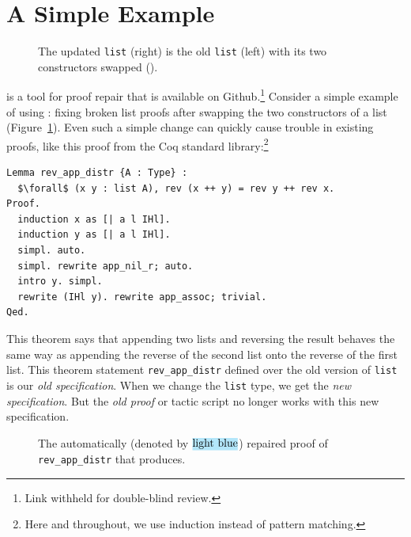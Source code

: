\section{A Simple Example}
\label{sec:overview}

\begin{figure}
\begin{minipage}{0.46\textwidth}
   
\end{minipage}
\hfill
\begin{minipage}{0.46\textwidth}
   
\end{minipage}
\caption{The updated \lstinline{list} (right) is the old \lstinline{list} (left) with its two constructors swapped ().}
\label{fig:listswap}
\end{figure}

\toolname is a tool for proof repair that is available on Github.\footnote{Link withheld for double-blind review.}
Consider a simple example of using \toolname: fixing broken list proofs after swapping the two constructors of a list (Figure~\ref{fig:listswap}).
Even such a simple change can quickly cause trouble in existing proofs, like this proof from the Coq standard library:\footnote{Here and throughout, we use induction instead of pattern matching.}

\begin{lstlisting}
Lemma rev_app_distr {A : Type} :
  $\forall$ (x y : list A), rev (x ++ y) = rev y ++ rev x.
Proof.
  induction x as [| a l IHl].
  induction y as [| a l IHl].
  simpl. auto.
  simpl. rewrite app_nil_r; auto.
  intro y. simpl.
  rewrite (IHl y). rewrite app_assoc; trivial.
Qed.
\end{lstlisting}
This theorem says that appending two lists and reversing the result behaves the same way as appending
the reverse of the second list onto the reverse of the first list.
This theorem statement \lstinline{rev_app_distr} defined over the old version of \lstinline{list} is our \textit{old specification}.
When we change the \lstinline{list} type, we get the \textit{new specification}.
But the \textit{old proof} or tactic script no longer works with this new specification.

\begin{figure}
\codeauto{}
\caption{The automatically (denoted by $\codeauto{light blue}$) repaired proof of \lstinline{rev_app_distr} that \toolname produces.}
\label{fig:auto}
\end{figure}

